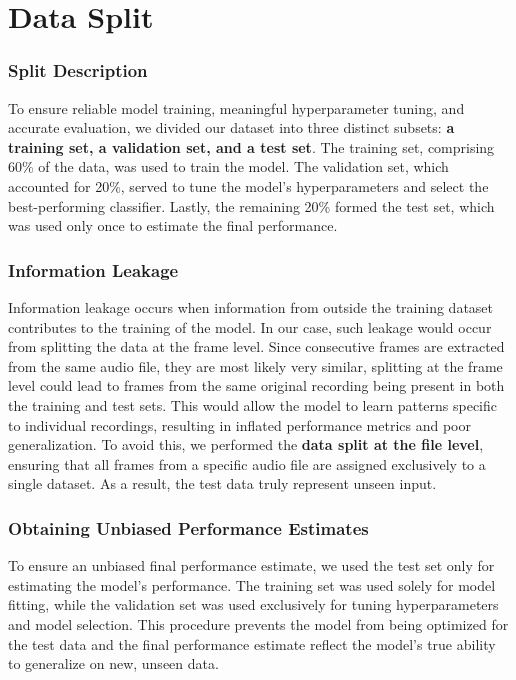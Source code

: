 \documentclass{article}
\begin{document}
\maketitle


\section{Data Split}

\subsubsection{Split Description}
To ensure reliable model training, meaningful hyperparameter tuning, and accurate evaluation, we divided our dataset into three distinct subsets: \textbf{a training set, a validation set, and a test set}. The training set, comprising 60\% of the data, was used to train the model. The validation set, which accounted for 20\%, served to tune the model’s hyperparameters and select the best-performing classifier. Lastly, the remaining 20\% formed the test set, which was used only once to estimate the final performance. 

\subsubsection{Information Leakage}
Information leakage occurs when information from outside the training dataset contributes to the training of the model. In our case, such leakage would occur from splitting the data at the frame level. Since consecutive frames are extracted from the same audio file, they are most likely very similar, splitting at the frame level could lead to frames from the same original recording being present in both the training and test sets. This would allow the model to learn patterns specific to individual recordings, resulting in inflated performance metrics and poor generalization. To avoid this, we performed the \textbf{data split at the file level}, ensuring that all frames from a specific audio file are assigned exclusively to a single dataset. As a result, the test data truly represent unseen input.  

\subsubsection{Obtaining Unbiased Performance Estimates}
To ensure an unbiased final performance estimate, we used the test set only for estimating the model’s performance. The training set was used solely for model fitting, while the validation set was used exclusively for tuning hyperparameters and model selection. This procedure prevents the model from being optimized for the test data and the final performance estimate reflect the model’s true ability to generalize on new, unseen data.

\end{document}
